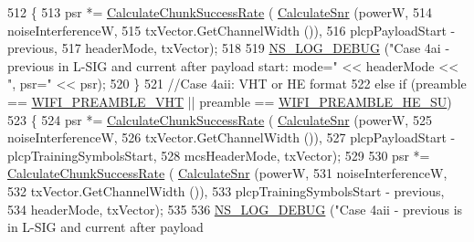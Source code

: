\begin{DoxyCode}
512                 \{
513                   psr *= \hyperlink{classns3_1_1InterferenceHelper_ab1c34c3f7ecef1e37ec778c0cf0e9cef}{CalculateChunkSuccessRate} (
      \hyperlink{classns3_1_1InterferenceHelper_a8f6192d041874595004c007c5a519b4b}{CalculateSnr} (powerW,
514                                                                   noiseInterferenceW,
515                                                                   txVector.GetChannelWidth ()),
516                                                     plcpPayloadStart - previous,
517                                                     headerMode, txVector);
518 
519                   \hyperlink{group__logging_ga413f1886406d49f59a6a0a89b77b4d0a}{NS\_LOG\_DEBUG} (\textcolor{stringliteral}{"Case 4ai - previous in L-SIG and current after payload start:
       mode="} << headerMode << \textcolor{stringliteral}{", psr="} << psr);
520                 \}
521               \textcolor{comment}{//Case 4aii: VHT or HE format}
522               \textcolor{keywordflow}{else} \textcolor{keywordflow}{if} (preamble == \hyperlink{group__wifi_gga5e94a56cb338a14ffbbb19c6a41251ebab90b0fe0b17f27e51c0fe16239e7b089}{WIFI\_PREAMBLE\_VHT} || preamble == 
      \hyperlink{group__wifi_gga5e94a56cb338a14ffbbb19c6a41251eba99c3e12c6e91fc9a9bee491d20dab807}{WIFI\_PREAMBLE\_HE\_SU})
523                 \{
524                   psr *= \hyperlink{classns3_1_1InterferenceHelper_ab1c34c3f7ecef1e37ec778c0cf0e9cef}{CalculateChunkSuccessRate} (
      \hyperlink{classns3_1_1InterferenceHelper_a8f6192d041874595004c007c5a519b4b}{CalculateSnr} (powerW,
525                                                                   noiseInterferenceW,
526                                                                   txVector.GetChannelWidth ()),
527                                                     plcpPayloadStart - plcpTrainingSymbolsStart,
528                                                     mcsHeaderMode, txVector);
529 
530                   psr *= \hyperlink{classns3_1_1InterferenceHelper_ab1c34c3f7ecef1e37ec778c0cf0e9cef}{CalculateChunkSuccessRate} (
      \hyperlink{classns3_1_1InterferenceHelper_a8f6192d041874595004c007c5a519b4b}{CalculateSnr} (powerW,
531                                                                   noiseInterferenceW,
532                                                                   txVector.GetChannelWidth ()),
533                                                     plcpTrainingSymbolsStart - previous,
534                                                     headerMode, txVector);
535 
536                   \hyperlink{group__logging_ga413f1886406d49f59a6a0a89b77b4d0a}{NS\_LOG\_DEBUG} (\textcolor{stringliteral}{"Case 4aii - previous is in L-SIG and current after payload
}
\end{DoxyCode}

